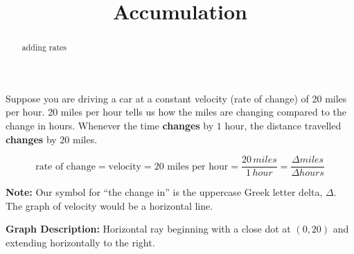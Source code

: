 \documentclass{ximera}
\title{Accumulation}
\begin{document}
\begin{abstract}
adding rates
\end{abstract}
\maketitle





Suppose you are driving a car at a constant velocity (rate of change) of 20 miles per hour. 20 miles per hour tells us how the miles are changing compared to the change in hours.  Whenever the time \textbf{\textcolor{purple!85!blue}{changes}} by $1$ hour, the distance travelled \textbf{\textcolor{purple!85!blue}{changes}} by $20$ miles.

\[
\text{rate of change} = \text{velocity} = \text{20 miles per hour} = \frac{20 \, miles}{1 \, hour} = \frac{\Delta miles}{\Delta hours}
\]

\textbf{Note:} Our symbol for ``the change in'' is the uppercase Greek letter delta, $\Delta$. \\

The graph of velocity would be a horizontal line.



\begin{image}
\end{image}

\textbf{Graph Description:} Horizontal ray beginning with a close dot at $(0,20)$ and extending horizontally to the right.
\end{document}

